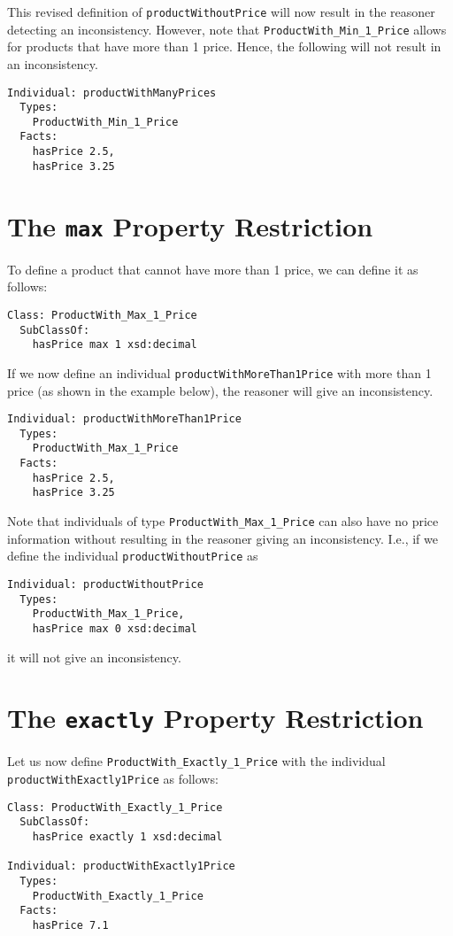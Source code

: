 \documentclass{amsart}
\begin{document}
This revised definition of \texttt{productWithoutPrice} will now result in the reasoner detecting an inconsistency. However, note that \texttt{ProductWith\_Min\_1\_Price} allows for products that have more than 1 price. Hence, the following will not result in an inconsistency.

\begin{small}
	\begin{verbatim} 
Individual: productWithManyPrices
  Types:  
    ProductWith_Min_1_Price
  Facts:  
    hasPrice 2.5,
    hasPrice 3.25 
	\end{verbatim}
\end{small}

\section{The \texttt{max} Property Restriction}
To define a product that cannot have more than 1 price, we can define it as follows:
\begin{small}
	\begin{verbatim} 
Class: ProductWith_Max_1_Price
  SubClassOf: 
    hasPrice max 1 xsd:decimal       
	\end{verbatim}
\end{small}

If we now define an individual \texttt{productWithMoreThan1Price} with more than 1 price (as shown in the example below), the reasoner will give an inconsistency. 
\begin{small}
	\begin{verbatim} 
Individual: productWithMoreThan1Price
  Types: 
    ProductWith_Max_1_Price
  Facts:  
    hasPrice 2.5,
    hasPrice 3.25      
	\end{verbatim}
\end{small}


Note that individuals of type \texttt{ProductWith\_Max\_1\_Price} can also have no price information without resulting in the reasoner giving an inconsistency. I.e., if we define the individual \texttt{productWithoutPrice} as
\begin{small}
	\begin{verbatim} 
Individual: productWithoutPrice
  Types:  
    ProductWith_Max_1_Price,
    hasPrice max 0 xsd:decimal    
	\end{verbatim}
\end{small}
it will not give an inconsistency.

\section{The \texttt{exactly} Property Restriction}
Let us now define \texttt{ProductWith\_Exactly\_1\_Price} with the individual \texttt{productWithExactly1Price} as follows:
\begin{small}
	\begin{verbatim} 
Class: ProductWith_Exactly_1_Price
  SubClassOf: 
    hasPrice exactly 1 xsd:decimal    
    
Individual: productWithExactly1Price
  Types: 
    ProductWith_Exactly_1_Price  
  Facts:
    hasPrice 7.1   
	\end{verbatim}
\end{small}
\end{document}
